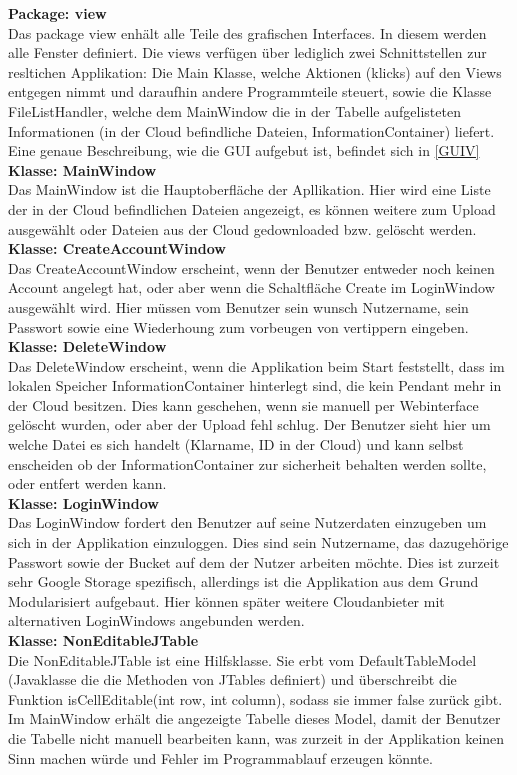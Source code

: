 \documentclass[12pt,a4paper,bibliography=totocnumbered,listof=totocnumbered]{scrartcl}
\begin{document}
\textbf{Package: view}\\
Das package view enhält alle Teile des grafischen Interfaces. In diesem werden alle Fenster definiert. Die views verfügen über lediglich zwei Schnittstellen zur resltichen Applikation: Die Main Klasse, welche Aktionen (klicks) auf den Views entgegen nimmt und daraufhin andere Programmteile steuert, sowie die Klasse FileListHandler, welche dem MainWindow die in der Tabelle aufgelisteten Informationen (in der Cloud befindliche Dateien, InformationContainer) liefert. Eine genaue Beschreibung, wie die GUI aufgebut ist, befindet sich in \ref{GUIV} \\
\textbf{Klasse: MainWindow}\\
Das MainWindow ist die Hauptoberfläche der Apllikation. Hier wird eine Liste der in der Cloud befindlichen Dateien angezeigt, es können weitere zum Upload ausgewählt oder Dateien aus der Cloud gedownloaded bzw. gelöscht werden.
\textbf{Klasse: CreateAccountWindow}\\
Das CreateAccountWindow erscheint, wenn der Benutzer entweder noch keinen Account angelegt hat, oder aber wenn die Schaltfläche Create im LoginWindow ausgewählt wird. Hier müssen vom Benutzer sein wunsch Nutzername, sein Passwort sowie eine Wiederhoung zum vorbeugen von vertippern eingeben.\\
\textbf{Klasse: DeleteWindow}\\
Das DeleteWindow erscheint, wenn die Applikation beim Start feststellt, dass im lokalen Speicher InformationContainer hinterlegt sind, die kein Pendant mehr in der Cloud besitzen. Dies kann geschehen, wenn sie manuell per Webinterface gelöscht wurden, oder aber der Upload fehl schlug. Der Benutzer sieht hier um welche Datei es sich handelt (Klarname, ID in der Cloud) und kann selbst enscheiden ob der InformationContainer zur sicherheit behalten werden sollte, oder entfert werden kann.\\
\textbf{Klasse: LoginWindow}\\
Das LoginWindow fordert den Benutzer auf seine Nutzerdaten einzugeben um sich in der Applikation einzuloggen. Dies sind sein Nutzername, das dazugehörige Passwort sowie der Bucket auf dem der Nutzer arbeiten möchte. Dies ist zurzeit sehr Google Storage spezifisch, allerdings ist die Applikation aus dem Grund Modularisiert aufgebaut. Hier können später weitere Cloudanbieter mit alternativen LoginWindows angebunden werden.\\
\textbf{Klasse: NonEditableJTable}\\
Die NonEditableJTable ist eine Hilfsklasse. Sie erbt vom DefaultTableModel (Javaklasse die die Methoden von JTables definiert) und überschreibt die Funktion isCellEditable(int row, int column), sodass sie immer false zurück gibt. Im MainWindow erhält die angezeigte Tabelle dieses Model, damit der Benutzer die Tabelle nicht manuell bearbeiten kann, was zurzeit in der Applikation keinen Sinn machen würde und Fehler im Programmablauf erzeugen könnte.\\
\end{document}
